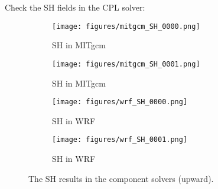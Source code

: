 
Check the SH fields in the CPL solver:

\begin{figure}[h!]
\centering
  \begin{subfigure}[b]{0.45\linewidth}
  \texttt{[image: figures/mitgcm\_SH\_0000.png]}
  \caption{SH in MITgcm}
  \end{subfigure}
  \begin{subfigure}[b]{0.45\linewidth}
  \texttt{[image: figures/mitgcm\_SH\_0001.png]}
  \caption{SH in MITgcm}
  \end{subfigure}
  \hspace{0.1in}
  \begin{subfigure}[b]{0.45\linewidth}
  \texttt{[image: figures/wrf\_SH\_0000.png]}
  \caption{SH in WRF}
  \end{subfigure}
  \begin{subfigure}[b]{0.45\linewidth}
  \texttt{[image: figures/wrf\_SH\_0001.png]}
  \caption{SH in WRF}
  \end{subfigure}
\caption{The SH results in the component solvers (upward).}
\label{fig:sh}
\end{figure}
